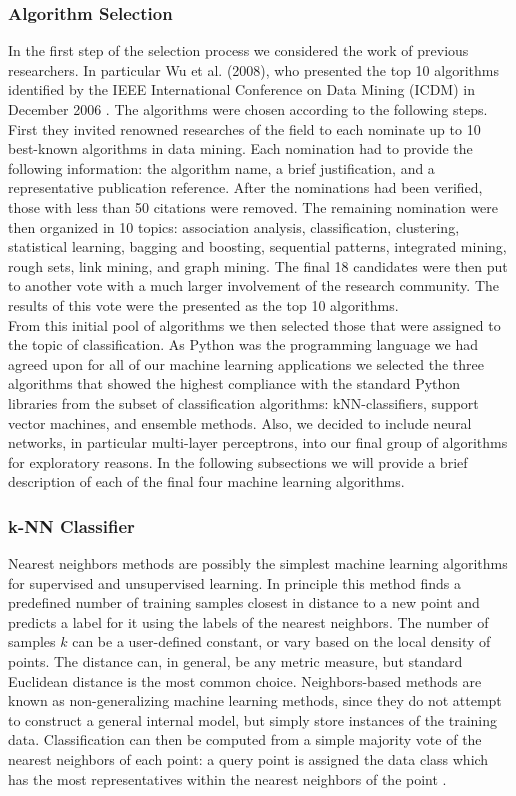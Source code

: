 \subsubsection{Algorithm Selection}\label{mlsel}
In the first step of the selection process we considered the work of previous researchers. In particular Wu et al. (2008), who presented the top 10 algorithms identified by the IEEE International Conference on Data Mining (ICDM) in December 2006 \cite{Wu2008}. The algorithms were chosen according to the following steps. First they invited renowned researches of the field to each nominate up to 10 best-known algorithms in data mining. Each nomination had to provide the following information: the algorithm name, a brief justification, and a representative publication reference. After the nominations had been verified, those with less than 50 citations were removed. The remaining nomination were then organized in 10 topics: association analysis, classification, clustering, statistical learning, bagging and boosting, sequential patterns, integrated mining, rough sets, link mining, and graph mining. The final 18 candidates were then put to another vote with a much larger involvement of the research community. The results of this vote were the presented as the top 10 algorithms.\\
From this initial pool of algorithms we then selected those that were assigned to the topic of classification. As Python was the programming language we had agreed upon for all of our machine learning applications we selected the three algorithms that showed the highest compliance with the standard Python libraries from the subset of classification algorithms: kNN-classifiers, support vector machines, and ensemble methods. Also, we decided to include neural networks, in particular multi-layer perceptrons, into our final group of algorithms for exploratory reasons. 
In the following subsections we will provide a brief description of each of the final four machine learning algorithms.

\subsubsection{k-NN Classifier} 
Nearest neighbors methods are possibly the simplest machine learning algorithms for supervised and unsupervised learning. In principle this method finds a predefined number of training samples closest in distance to a new point and predicts a label for it using the labels of the nearest neighbors. The number of samples $k$ can be a user-defined constant, or vary based on the local density of points. The distance can, in general, be any metric measure, but standard Euclidean distance is the most common choice. Neighbors-based methods are known as non-generalizing machine learning methods, since they do not attempt to construct a general internal model, but simply store instances of the training data. Classification can then be computed from a simple majority vote of the nearest neighbors of each point: a query point is assigned the data class which has the most representatives within the nearest neighbors of the point \cite{Pedregosa2011}. 

